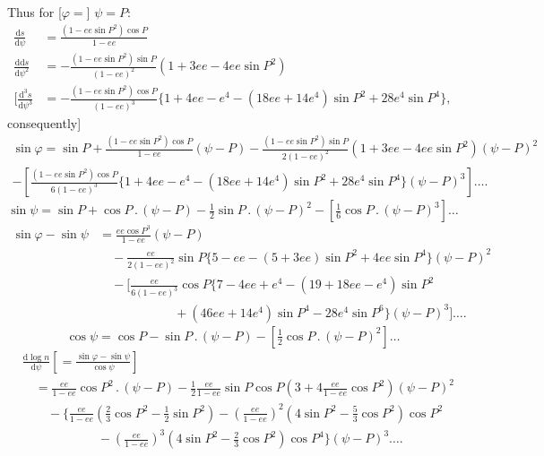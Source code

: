 \par\clearpage
\noindent{}\makebox[12mm][r]{}\par\medskip

\noindent Thus for [\(\varphi=\)] \(\psi=P\):
\[
\begin{aligned}
\frac{\mathrm ds}{\mathrm d\psi}
&=\frac{(1-ee\sin P^2)\cos P}{1-ee}\\
\frac{\mathrm{dd}s}{\mathrm d\psi^2}
&=-\frac{(1-ee\sin P^2)\sin P}{(1-ee)^2}(1+3ee-4ee\sin P^2)\\
\mathopen{\Big[}\frac{\mathrm d^3s}{\mathrm d\psi^3}
&=-\frac{(1-ee\sin P^2)\cos P}{(1-ee)^3}
\{1+4ee-e^4-(18ee+14e^4)\sin P^2+28e^4\sin P^4\},
\end{aligned}
\]
\noindent consequently]
\[
\begin{gathered}
\sin\varphi=\sin P+\frac{(1-ee\sin P^2)\cos P}{1-ee}(\psi-P)
-\frac{(1-ee\sin P^2)\sin P}{2(1-ee)^2}(1+3ee-4ee\sin P^2)(\psi-P)^2\\
-\left[\frac{(1-ee\sin P^2)\cos P}{6(1-ee)^3}
\{1+4ee-e^4-(18ee+14e^4)\sin P^2+28e^4\sin P^4\}(\psi-P)^3\right]\ldots.
\end{gathered}
\]
\noindent [Since]
\[
\sin\psi=\sin P+\cos P\,.\,(\psi-P)-\tfrac12\sin P\,.\,(\psi-P)^2
-[\tfrac16\cos P\,.\,(\psi-P)^3]\ldots
\]
\[
\begin{aligned}
\sin\varphi-\sin\psi&=\frac{ee\cos P^3}{1-ee}(\psi-P)\\
&\quad-\frac{ee}{2(1-ee)^2}\sin P\{5-ee-(5+3ee)\sin P^2+4ee\sin P^4\}(\psi-P)^2\\
&\quad-\Big[\frac{ee}{6(1-ee)^3}\cos P\{7-4ee+e^4-(19+18ee-e^4)\sin P^2\\
&\qquad\qquad\qquad+(46ee+14e^4)\sin P^4-28e^4\sin P^6\}(\psi-P)^3\Big]\ldots.
\end{aligned}
\]
\noindent [Using]
\[
\cos\psi=\cos P-\sin P\,.\,(\psi-P)-[\tfrac12\cos P\,.\,(\psi-P)^2]\ldots
\]
\[
\begin{aligned}
&\frac{\mathrm d\log n}{\mathrm d\psi}
\left[=\frac{\sin\varphi-\sin\psi}{\cos\psi}\right]\\
&\quad=\frac{ee}{1-ee}\cos P^2\,.\,(\psi-P)
-\tfrac12\frac{ee}{1-ee}\sin P\cos P
\left(3+4\frac{ee}{1-ee}\cos P^2\right)(\psi-P)^2\\
&\qquad-\Big\{\frac{ee}{1-ee}(\tfrac23\cos P^2-\tfrac12\sin P^2)
-\left(\frac{ee}{1-ee}\right)^2(4\sin P^2-\tfrac53\cos P^2)\cos P^2\\
&\qquad\qquad\qquad-\left(\frac{ee}{1-ee}\right)^3
(4\sin P^2-\tfrac23\cos P^2)\cos P^4\Big\}(\psi-P)^3\ldots.
\end{aligned}
\]

